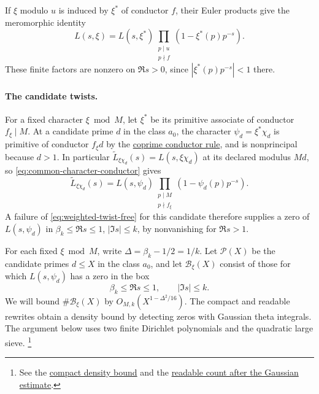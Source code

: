 %
If \(\xi\) modulo \(u\) is induced by \(\xi^*\) of conductor \(f\),
their Euler products give the meromorphic identity
\begin{equation}\label{eq:common-character-conductor}
 L(s,\xi)=L(s,\xi^*)\prod_{\substack{p\mid u\\p\nmid f}}(1-\xi^*(p)p^{-s}).
\end{equation}
\cite[(25.15.4)]{dlmf}
These finite factors are nonzero on \(\Re s>0\), since
\(|\xi^*(p)p^{-s}|<1\) there.

\paragraph{The candidate twists.}
%
For a fixed character \(\xi\bmod M\), let \(\xi^*\) be its primitive
associate of conductor \(f_\xi\mid M\). At a candidate prime \(d\) in the
class \(a_0\), the character \(\psi_d=\xi^*\chi_d\) is primitive of
conductor \(f_\xi d\) by the
\hyperlink{proof.coprime-character-product}{coprime conductor rule},
and is nonprincipal because \(d>1\). In particular
\(\widetilde L_{\xi\chi_d}(s)=L(s,\xi\chi_d)\) at its declared modulus
\(Md\), so \eqref{eq:common-character-conductor} gives
\[
 \widetilde L_{\xi\chi_d}(s)=L(s,\psi_d)
      \prod_{\substack{p\mid M\\p\nmid f_\xi}}(1-\psi_d(p)p^{-s}).
\]
A failure of
\eqref{eq:weighted-twist-free} for this candidate therefore supplies a zero
of \(L(s,\psi_d)\) in \(\beta_k\le\Re s\le1\), \(|\Im s|\le k\), by
nonvanishing for \(\Re s>1\).

%
%
For each fixed \(\xi\bmod M\), write \(\Delta=\beta_k-1/2=1/k\).
Let \(\mathcal P(X)\) be the candidate primes \(d\le X\) in the class \(a_0\),
and let \(\mathcal B_\xi(X)\) consist of those for which
\(L(s,\psi_d)\) has a zero in the box
\[
 \beta_k\le\Re s\le1,\qquad |\Im s|\le k .
\]
We will bound \(\#\mathcal B_\xi(X)\) by \(O_{M,k}(X^{1-\Delta^2/16})\).
The compact and readable rewrites obtain a density bound by detecting
zeros with Gaussian theta integrals. The argument below uses two finite
Dirichlet polynomials and the quadratic large sieve.
\footnote{See the \href{https://github.com/lsernau/grh-lean/blob/72fead102f663d5c7a407964a13dc0cf9d977207/grh-compact/src/Lib/Analytic/QuadraticTwist/ZeroFreeTwist.lean\#L144-L186}{compact density bound} and the
\href{https://github.com/lsernau/grh-lean/blob/72fead102f663d5c7a407964a13dc0cf9d977207/grh/src/Lib/Analytic/QuadraticTwist.lean\#L679-L722}{readable count after the Gaussian estimate}.}

